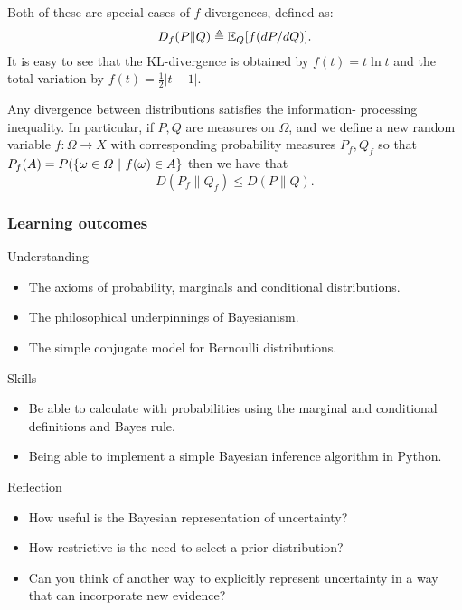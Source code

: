 Both of these are special cases of $f$-divergences, defined as:
\begin{equation}
  D_f(P\|Q) \mathrel{\triangleq} \mathop{\mbox{\ensuremath{\mathbb{E}}}}\nolimits_Q[f(dP/dQ)].
  \label{eq:f-divergence}
\end{equation}
It is easy to see that the KL-divergence is obtained by
$f(t) = t \ln t$ and the total variation by
$f(t) = \frac{1}{2}|t - 1|$.

Any divergence between distributions satisfies the information- processing inequality. In particular, if $P, Q$ are measures on $\Omega$, and we define a new random variable $f : \Omega \to X$ with corresponding probability measures $P_f, Q_f$ so that $P_f(A) = P(\left\{\omega \in \Omega ~\middle|~ f(\omega) \in A\right\}$ then we have that
\begin{equation}
  \label{eq:inf-proc}
  D(P_f\|Q_f) \leq D(P \| Q).
\end{equation}

\begin{frame}
  \frametitle{Learning outcomes}
  \begin{block}{Understanding}
    \begin{itemize}
    \item The axioms of probability, marginals and conditional distributions.
    \item The philosophical underpinnings of Bayesianism.
    \item The simple conjugate model for Bernoulli distributions.
    \end{itemize}
  \end{block}
  
  \begin{block}{Skills}
    \begin{itemize}
    \item Be able to calculate with probabilities using the marginal and conditional definitions and Bayes rule.
    \item Being able to implement a simple Bayesian inference algorithm in Python.
    \end{itemize}
  \end{block}

  \begin{block}{Reflection}
    \begin{itemize}
    \item How useful is the Bayesian representation of uncertainty?
    \item How restrictive is the need to select a prior distribution?
    \item Can you think of another way to explicitly represent uncertainty in a way that can incorporate new evidence?
    \end{itemize}
  \end{block}
  
\end{frame}

